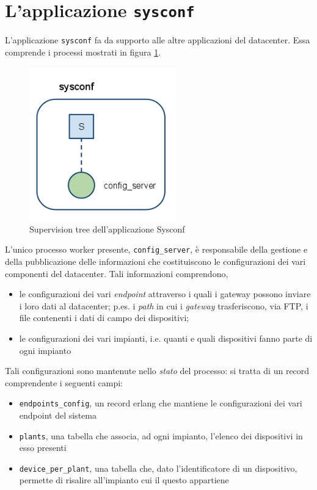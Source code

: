 \section{L'applicazione \texttt{sysconf}}
%
L'applicazione \texttt{sysconf} fa da supporto alle altre applicazioni del datacenter.
Essa comprende i processi mostrati in figura \ref{sysconfsuptree}.
%
\begin{figure}[!h]
\centering
\includegraphics[width=180pt]{img/sysconf.png}
\caption{Supervision tree dell'applicazione Sysconf}
\label{sysconfsuptree}
\end{figure}
%

%
L'unico processo worker presente, \texttt{config\_server}, \`e responsabile della 
gestione e della pubblicazione delle informazioni che costituiscono le configurazioni
dei vari componenti del datacenter. Tali informazioni comprendono,
%
\begin{itemize}
\item le configurazioni dei vari \emph{endpoint} attraverso i quali i gateway possono
      inviare i loro dati al datacenter; p.es. i \emph{path} in cui i \emph{gateway} 
      trasferiscono, via FTP, i file contenenti i dati di campo dei dispositivi;
%
\item le configurazioni dei vari impianti, i.e. quanti e quali dispositivi fanno 
      parte di ogni impianto
\end{itemize}
%
Tali configurazioni sono mantenute nello \emph{stato} del processo: si tratta di un record 
comprendente i seguenti campi:
%
\begin{itemize}
\item \texttt{endpoints\_config}, un record erlang che mantiene le configurazioni dei 
      vari endpoint del sistema
%
\item \texttt{plants}, una tabella che associa, ad ogni impianto, l'elenco dei dispositivi 
      in esso presenti
%
\item \texttt{device\_per\_plant}, una tabella che, dato l'identificatore di un dispositivo,
      permette di risalire all'impianto cui il questo appartiene
\end{itemize}
%

